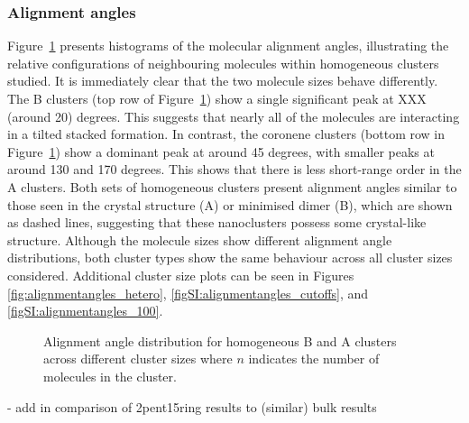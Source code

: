 \subsubsection{Alignment angles}

Figure~\ref{fig:alignmentangles_homo} presents histograms of the molecular alignment angles, illustrating the relative configurations of neighbouring molecules within homogeneous clusters studied.
It is immediately clear that the two molecule sizes behave differently. The B clusters (top row of Figure~\ref{fig:alignmentangles_homo}) show a single significant peak at XXX (around 20) degrees.  This suggests that nearly all of the molecules are interacting in a tilted stacked formation. In contrast, the coronene clusters (bottom row in Figure~\ref{fig:alignmentangles_homo}) show a dominant peak at around 45 degrees, with smaller peaks at around 130 and 170 degrees. This shows that there is less short-range order in the A clusters. Both sets of homogeneous clusters present alignment angles similar to those seen in the crystal structure (A) or minimised dimer (B), which are shown as dashed lines, suggesting that these nanoclusters possess some crystal-like structure.  Although the molecule sizes show different alignment angle distributions, both cluster types show the same behaviour across all cluster sizes considered. Additional cluster size plots can be seen in Figures \ref{fig:alignmentangles_hetero}, \ref{figSI:alignmentangles_cutoffs}, and \ref{figSI:alignmentangles_100}.
%
\begin{figure}[!tbh]
\centering
\caption{Alignment angle distribution for homogeneous B and A clusters across different cluster sizes where $n$ indicates the number of molecules in the cluster.}
\label{fig:alignmentangles_homo}
\end{figure}
%


- add in comparison of 2pent15ring results to (similar) bulk results


